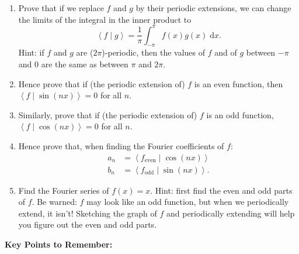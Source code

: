 \documentclass{article}
\newcommand{\diff}{\;\mathrm{d}}
\newcommand{\braket}[2]{\left\langle #1 \mid #2 \right\rangle}
\begin{document}
\begin{enumerate}
	\item Prove that if we replace $f$ and $g$ by their periodic extensions, we can change the limits of the integral in the inner product to
		\[\braket{f}{g}=\frac{1}{\pi}\int_{-\pi}^\pi f(x)g(x)\diff x.\]
		Hint: if $f$ and $g$ are ($2\pi$)-periodic, then the values of $f$ and of $g$ between $-\pi$ and $0$ are the same as between $\pi$ and $2\pi$.
	\item Hence prove that if (the periodic extension of) $f$ is an even function, then $\braket{f}{\sin(nx)}=0$ for all $n$.
	\item Similarly, prove that if (the periodic extension of) $f$ is an odd function, $\braket{f}{\cos(nx)}=0$ for all $n$.
	\item Hence prove that, when finding the Fourier coefficients of $f$:
		\begin{align*}
			a_n&=\braket{f_\mathrm{even}}{\cos(nx)}\\
			b_n&=\braket{f_\mathrm{odd}}{\sin(nx)}.
		\end{align*}
	\item Find the Fourier series of $f(x)=x$.
		Hint: first find the even and odd parts of $f$. Be warned: $f$ may look like an odd function, but when we periodically extend, it isn't! Sketching the graph of $f$ and periodically extending will help you figure out the even and odd parts.
\end{enumerate}














\clearpage




{\bf Key Points to Remember:}

\vspace{5mm}
\end{document}

